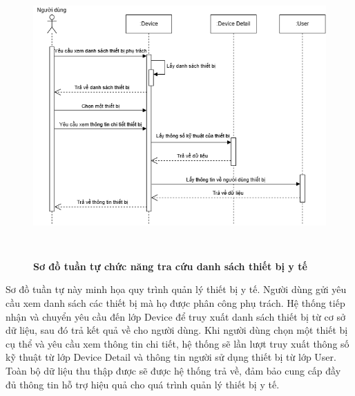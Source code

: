 \begin{figure}[H]
	\centering
	\includegraphics[width=12.8cm,height=10.8cm]{Images/sequence/device/getAll.drawio.png}
	\caption[Sơ đồ tuần tự chức năng tra cứu danh sách thiết bị y tế]{\bfseries \fontsize{12pt}{0pt}
		\selectfont Sơ đồ tuần tự chức năng tra cứu danh sách thiết bị y tế}
	\label{sequence_get_all_device} %
\end{figure}
Sơ đồ tuần tự này minh họa quy trình quản lý thiết bị y tế. Người dùng gửi yêu cầu xem danh sách các thiết bị mà họ được phân công phụ trách.
Hệ thống tiếp nhận và chuyển yêu cầu đến lớp Device để truy xuất danh sách thiết bị từ cơ sở dữ liệu, sau đó trả kết quả về cho người dùng.
Khi người dùng chọn một thiết bị cụ thể và yêu cầu xem thông tin chi tiết, hệ thống sẽ lần lượt truy xuất thông số kỹ thuật từ lớp Device Detail và thông tin người sử dụng thiết bị từ lớp User.
Toàn bộ dữ liệu thu thập được sẽ được hệ thống trả về, đảm bảo cung cấp đầy đủ thông tin hỗ trợ hiệu quả cho quá trình quản lý thiết bị y tế.

